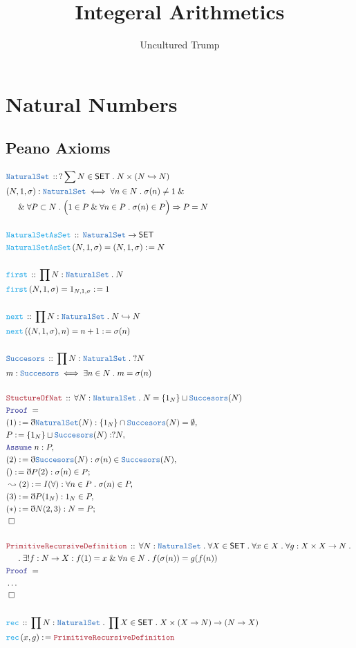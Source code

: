 \documentclass[12pt]{scrartcl}
\title{Integeral Arithmetics}
\author{Uncultured Trump}
\newcommand{\TYPE}[1]{\textcolor{NavyBlue}{\mathtt{#1}}}
\newcommand{\FUNC}[1]{\textcolor{Cerulean}{\mathtt{#1}}}
\newcommand{\LOGIC}[1]{\textcolor{Blue}{\mathtt{#1}}}
\newcommand{\THM}[1]{\textcolor{Maroon}{\mathtt{#1}}}
\renewcommand{\.}{\; . \;}
\newcommand{\de}{: \kern 0.1pc =}
\newcommand{\Act}[1]{\left( #1 \right)}
\newcommand{\Theorem}[2]{& \THM{#1} \, :: \, #2 \\ & \Proof = \\ }
\newcommand{\DeclareType}[2]{& \TYPE{#1} \, :: \, #2 \\}
\newcommand{\DefineType}[3]{& #1 : \TYPE{#2} \iff #3 \\}
\newcommand{\DeclareFunc}[2]{& \FUNC{#1} \, :: \, #2 \\}
\newcommand{\DefineFunc}[3]{&  \FUNC{#1}\Act{#2} \de #3 \\}
\newcommand{\DefineNamedFunc}[4]{&  \FUNC{#1}\Act{#2} = #3 \de #4 \\}
\newcommand{\NewLine}{\\ & \kern 1pc}
\newcommand{\Page}[1]{ \begin{align*} #1 \end{align*}   }
\newcommand{ \bd }{ \ByDef }
\newcommand{\NoProof}{ & \ldots \\ \EndProof}
\renewcommand{\And}{\; \& \;}
\newcommand{\ToInj}{\hookrightarrow}
\newcommand{\Say}[3]{& #1 \de #2 : #3, \\}
\newcommand{\Conclude}[3]{& #1 \de #2 : #3; \\}
\newcommand{\Derive}[3]{& \leadsto #1 \de #2 : #3, \\}
\newcommand{\Assume}[2]{& \LOGIC{Assume} \; #1 : #2, \\}
\newcommand{\QED}{\; \square}
\newcommand{\EndProof}{& \QED \\}
\newcommand{\ByDef}{\eth}
\newcommand{\Proof}{\LOGIC{Proof} \; }
\newcommand{\SET}{\mathsf{SET}}
\begin{document}
\maketitle
\newpage
\tableofcontents
\newpage
\section{Natural Numbers}
\subsection{Peano Axioms}
\Page{
	\DeclareType{NaturalSet}{?\sum N \in \SET \. N \times (N \ToInj N) }
	\DefineType{(N,1,\sigma)}{NaturalSet}{  
		\forall n \in N \. \sigma(n) \neq 1 \And \NewLine \And
		\forall P \subset N \. \Big(1 \in P \And \forall n \in P \. \sigma(n) \in P  \Big)
		\Rightarrow P = N
	}
	\\
	\DeclareFunc{NaturalSetAsSet}{ \TYPE{NaturalSet} \to \SET}
	\DefineNamedFunc{NaturalSetAsSet}{ N,1,\sigma  }{(N,1,\sigma)}{ N }
	\\
	\DeclareFunc{first}{\prod N : \TYPE{NaturalSet} \. N} 
	\DefineNamedFunc{first}{N,1,\sigma}{1_{N,1,\sigma}}{1}
	\\
	\DeclareFunc{next}{\prod N : \TYPE{NaturalSet} \. N \ToInj N}
	\DefineNamedFunc{next}{(N,1,\sigma),n}{n+ 1}{\sigma(n)}    
	\\
	\DeclareType{Succesors}{  \prod N : \TYPE{NaturalSet} \. ?N  }
	\DefineType{m}{Succesors}{ \exists n \in N \. m = \sigma(n) }
	\\
	\Theorem{StuctureOfNat}{\forall N : \TYPE{NaturalSet} \. N = \{1_N\} \sqcup \TYPE{Succesors}(N)}
	\Say{(1)}{\bd \TYPE{NaturalSet}(N)}{ \{1_N\} \cap \TYPE{Succesors}(N) = \emptyset}
	\Say{P}{ \{1_N\} \sqcup \TYPE{Succesors}(N)  }{?N}
	\Assume{n}{P}
	\Say{(2)}{\bd \TYPE{Succesors}(N)}{\sigma(n) \in \TYPE{Succesors}(N)}
	\Conclude{()}{\bd P(2)}{\sigma(n) \in P }
	\Derive{(2)}{I(\forall)}{\forall n \in P \. \sigma(n) \in P}
	\Say{(3)}{\bd P(1_N)}{1_N \in P}
	\Conclude{(*)}{\bd N(2,3)}{N = P}
	\EndProof
	\\
	\Theorem{PrimitiveRecursiveDefinition}{ 
		\forall N : \TYPE{NaturalSet} \. \forall X \in \SET \. \forall x \in X \. \forall g : X \times X \to N \. 
		 \NewLine \.   \exists! f : N \to X : f(1) = x \And \forall n \in N \. f(\sigma(n)) = g(f(n))                                 
		}
	\NoProof
	\\
	\DeclareFunc{rec}{\prod N : \TYPE{NaturalSet} \. \prod X \in \SET \. X \times (X  \to N ) \to (N \to X) }
	\DefineFunc{rec}{x,g}{\THM{PrimitiveRecursiveDefinition}}
}
\end{document}
